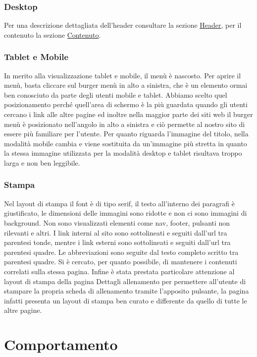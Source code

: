 \documentclass[a4paper]{article}
\begin{document}
	\subsubsection{Desktop}
	Per una descrizione dettagliata dell'header consultare la sezione \hyperref[header]{Header}, per il contenuto la sezione \hyperref[contenuto]{Contenuto}.

	\subsubsection{Tablet e Mobile}
	In merito alla visualizzazione tablet e mobile, il menù è nascosto. Per aprire il menù, basta cliccare sul burger menù in alto a sinistra, che è un elemento ormai ben conosciuto da parte degli utenti mobile e tablet. Abbiamo scelto quel posizionamento perché quell'area di schermo è la più guardata quando gli utenti cercano i link alle altre pagine ed inoltre nella maggior parte dei siti web il burger menù è posizionato nell'angolo in alto a sinistra e ciò permette al nostro sito di essere più familiare per l'utente. Per quanto riguarda l'immagine del titolo, nella modalità mobile cambia e viene sostituita da un'immagine più stretta in quanto la stessa immagine utilizzata per la modalità desktop e tablet risultava troppo larga e non ben leggibile. 


	\subsubsection{Stampa}
	Nel layout di stampa il font è di tipo serif, il testo all'interno dei paragrafi è giustificato, le dimensioni delle immagini sono ridotte e non ci sono immagini di background. Non sono visualizzati elementi come nav, footer, pulsanti non rilevanti e altri. I link interni al sito sono sottolineati e seguiti dall'url tra parentesi tonde, mentre i link esterni sono sottolineati e seguiti dall'url tra parentesi quadre. Le abbreviazioni sono seguite dal testo completo scritto tra parentesi quadre. Si è cercato, per quanto possibile, di mantenere i contenuti correlati sulla stessa pagina. Infine è stata prestata particolare attenzione al layout di stampa della pagina Dettagli allenamento per permettere all'utente di stampare la propria scheda di allenamento tramite l'apposito pulsante, la pagina infatti presenta un layout di stampa ben curato e differente da quello di tutte le altre pagine.

	\section{Comportamento}
\end{document}
